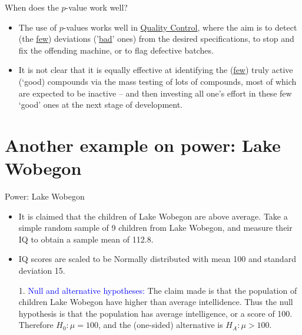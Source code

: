 \documentclass[10pt,handout]{beamer}\usepackage[]{graphicx}\usepackage[]{color}
\begin{document}
\begin{frame}{When does the $p$-value work well?}
	\begin{itemize}
		\small
		\setlength\itemsep{1em}
		\item The use of $p$-values works well in \underline{Quality Control}, where the aim is to detect
		(the \underline{few})  deviations ('\underline{bad}' ones)  from the desired specifications, to stop and fix	the offending machine, or to flag defective batches. \pause 
		\item It is not clear that it is equally effective at identifying the (\underline{few}) truly active (`{good}) compounds	via the mass testing of lots of compounds, most of which are expected to be inactive -- and then investing all one's effort in these few `good' ones at the next stage of development.
	\end{itemize}
\end{frame}


\section{Another example on power: Lake Wobegon}

\begin{frame}[fragile]{Power: Lake Wobegon}
	\small
	\begin{itemize}
		\item It is claimed that the children of Lake Wobegon are above
		average. Take a simple random sample of 9 children from Lake
		Wobegon, and measure their IQ to obtain a sample mean of 112.8. 
		\item IQ scores are scaled to be Normally distributed with mean 100 and
		standard deviation 15. 
		\item[]\item[1.] \textcolor{blue}{Null and alternative hypotheses:} The claim made is
		that the population of children Lake Wobegon have higher than
		average intellidence. Thus the null hypothesis is that the
		population has average intelligence, or a score of 100. Therefore
		$H_0: \mu=100$, and the (one-sided) alternative is $H_A: \mu >
		100$.
	\end{itemize}
\end{frame}
\end{document}
